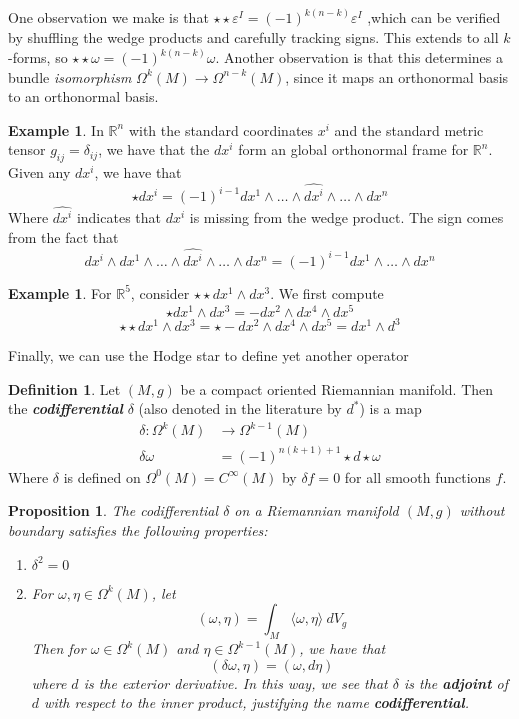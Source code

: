 \documentclass[psamsfonts]{amsart}
\newtheorem{prop}[thm]{Proposition}
\theoremstyle{definition}
\newtheorem{defn}[thm]{Definition}
\newtheorem{exmp}[thm]{Example}
\theoremstyle{remark}
\newcommand{\R}{\mathbb{R}}
\newcommand{\ib}[1]{\textbf{\textit{#1}}}
\begin{document}
One observation we make is that $\star\star \varepsilon^I = (-1)^{k(n-k)}\varepsilon^I$ ,which can be verified by shuffling the wedge products and carefully tracking signs. This extends to all $k$-forms, so $\star \star\omega = (-1)^{k(n-k)}\omega$. Another observation is that this determines a bundle \emph{isomorphism} $\Omega^k(M) \to \Omega^{n-k}(M)$, since it maps an orthonormal basis to an orthonormal basis.
\begin{exmp}
In $\R^n$ with the standard coordinates $x^i$  and the standard metric tensor  $g_{ij} = \delta_{ij}$, we have that the $dx^i$ form an global orthonormal frame for $\R^n$. Given any $dx^i$, we have that 
$$\star dx^i =  (-1)^{i-1} dx^1 \wedge \ldots \wedge \hat{dx^i} \wedge \ldots \wedge dx^n $$
Where $\hat{dx^i}$ indicates that $dx^i$ is missing  from the wedge product. The sign comes from the fact that 
$$dx^i \wedge dx^1 \wedge \ldots \wedge \hat{dx^i} \wedge \ldots \wedge dx^n = (-1)^{i-1} dx^1\wedge \ldots \wedge dx^n$$
\end{exmp}
%
\begin{exmp}
For $\R^5$,  consider $\star\star dx^1 \wedge dx^3$. We first compute
$$\star dx^1 \wedge dx^3 = -dx^2 \wedge dx^4 \wedge dx^5 $$
$$\star\star dx^1\wedge dx^3 = \star -dx^2 \wedge dx^4 \wedge dx^5 = dx^1 \wedge d^3$$
\end{exmp}
%
Finally, we can use the Hodge star to define yet another operator
\begin{defn}
Let $(M,g)$ be a compact oriented Riemannian manifold. Then the \ib{codifferential} $\delta$ (also denoted in the literature by $d^*$) is a map
\begin{align*}
\delta: \Omega^k(M) &\to \Omega^{k-1}(M) \\
\delta \omega &= (-1)^{n(k+1)+1}\star d \star \omega
\end{align*}
Where $\delta$ is  defined on $\Omega^0(M) = C^\infty(M)$ by  $\delta f = 0$ for all smooth functions $f$.
\end{defn}
%
\begin{prop}
The codifferential $\delta$ on  a Riemannian manifold $(M,g)$ without boundary satisfies the following properties:
\begin{enumerate}
\item $\delta^2 = 0$ 
\item For $\omega,\eta \in \Omega^k(M)$, let 
$$(\omega, \eta) = \int_M \langle \omega, \eta \rangle ~dV_g$$
Then for $\omega \in \Omega^k(M)$ and $\eta \in \Omega^{k-1}(M)$, we have that 
$$(\delta \omega, \eta) = (\omega, d\eta) $$
where $d$ is the exterior derivative. In this way, we see that $\delta$  is the \ib{adjoint} of $d$ with respect to the inner product, justifying the name \ib{codifferential}.
\end{enumerate}
\end{prop}
\end{document}
